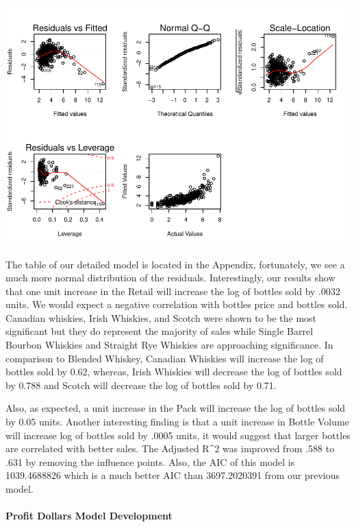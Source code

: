 \documentclass[]{elsarticle} %
\makeatletter
\def\maxwidth{\ifdim\Gin@nat@width>\linewidth\linewidth
\else\Gin@nat@width\fi}
\let\Oldincludegraphics\includegraphics
\renewcommand{\includegraphics}[1]{\Oldincludegraphics[width=\maxwidth]{#1}}
\makeatother
\begin{document}
\includegraphics{Final_Project_files/figure-latex/unnamed-chunk-16-1.pdf}

\bigskip

The table of our detailed model is located in the Appendix, fortunately,
we see a much more normal distribution of the residuals. Interestingly,
our results show that one unit increase in the Retail will increase the
log of bottles sold by .0032 units. We would expect a negative
correlation with bottles price and bottles sold. Canadian whiskies,
Irish Whiskies, and Scotch were shown to be the most significant but
they do represent the majority of sales while Single Barrel Bourbon
Whiskies and Straight Rye Whiskies are approaching significance. In
comparison to Blended Whiskey, Canadian Whiskies will increase the log
of bottles sold by 0.62, whereas, Irish Whiskies will decrease the log
of bottles sold by 0.788 and Scotch will decrease the log of bottles
sold by 0.71.

Also, as expected, a unit increase in the Pack will increase the log of
bottles sold by 0.05 units. Another interesting finding is that a unit
increase in Bottle Volume will increase log of bottles sold by .0005
units, it would suggest that larger bottles are correlated with better
sales. The Adjusted R\^{}2 was improved from .588 to .631 by removing
the influence points. Also, the AIC of this model is 1039.4688826 which
is a much better AIC than 3697.2020391 from our previous model.

\newpage

\paragraph{Profit Dollars Model
Development}\label{profit-dollars-model-development}
\end{document}
